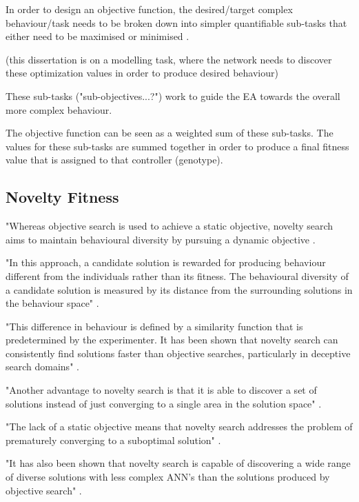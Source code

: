 In order to design an objective function, the desired/target complex behaviour/task needs to be broken down into simpler quantifiable sub-tasks that either need to be maximised or minimised \cite{lehman2011abandoning}.

(this dissertation is on a modelling task, where the network needs to discover these optimization values in order to produce desired behaviour) 

These sub-tasks ("sub-objectives...?") work to guide the EA towards the overall more complex behaviour.	

The objective function can be seen as a weighted sum of these sub-tasks. The values for these sub-tasks are summed together in order to produce a final fitness value that is assigned to that controller (genotype). 


\subsection{Novelty Fitness}

"Whereas objective search is used to achieve a static objective, novelty search aims to maintain behavioural diversity by pursuing a dynamic objective \cite{RefWorks:5}.

"In this approach, a candidate solution is rewarded for producing behaviour different from the individuals rather than its fitness. The behavioural diversity of a candidate solution is measured by its distance from the surrounding solutions in the behaviour space" \cite{RefWorks:11}.

"This difference in behaviour is defined by a similarity function that is predetermined by the experimenter. It has been shown that novelty search can consistently find solutions faster than objective searches, particularly in deceptive search domains" \cite{lehman2008exploiting, RefWorks:5}.

"Another advantage to novelty search is that it is able to discover a set of solutions instead of just converging to a single area in the solution space" \cite{RefWorks:11}.

"The lack of a static objective means that novelty search addresses the problem of prematurely converging to a suboptimal solution" \cite{RefWorks:11}.

"It has also been shown that novelty search is capable of discovering a wide range of diverse solutions with less complex ANN's than the solutions produced by objective search" \cite{RefWorks:11}.



